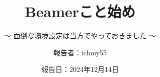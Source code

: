 %
\title{Beamerこと始め}
\subtitle{～ 面倒な環境設定は当方でやっておきました ～}
%
\def\logoC{lowerleft.png}
%
%
%
\date[Dec.14th,2024]{報告日：2024年12月14日}
\author[ichmy55]{報告者：ichmy55}
\subject{Recommendation for hexahedral mesh}

